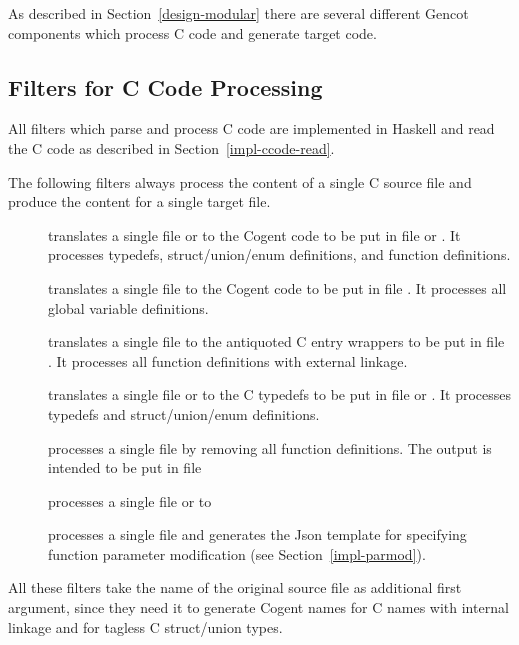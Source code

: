 As described in Section~\ref{design-modular} there are several different Gencot components which process C code and generate 
target code.

\subsection{Filters for C Code Processing}
\label{impl-ccomps-filters}

All filters which parse and process C code are implemented in Haskell and read the
C code as described in Section~\ref{impl-ccode-read}.

The following filters always process the content of a single C source file and produce the content for a single 
target file.
\begin{description}
\item[] translates a single file  or  to the Cogent code to be put in file
 or . It processes typedefs, struct/union/enum definitions, and function
definitions. 
\item[] translates a single file  to the Cogent code to be put in file .
It processes all global variable definitions.
\item[] translates a single file  to the antiquoted C entry wrappers to be put in
file . It processes all function definitions with external linkage.
\item[] translates a single file  or  to the C typedefs to be put in
file  or . It processes typedefs and struct/union/enum definitions.
\item[] processes a single file  by removing all function definitions. The output
is intended to be put in file 
\item[] processes a single file  or  to 
\item[] processes a single file  and generates the Json template for specifying
function parameter modification (see Section~\ref{impl-parmod}).
\end{description}

All these filters take the name of the original source file as additional first
argument, since they need it to generate Cogent names for C names with internal linkage and for tagless C struct/union
types.

